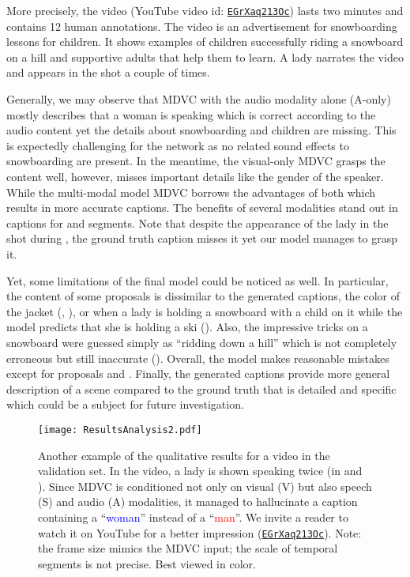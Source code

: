 \documentclass[10pt,twocolumn,letterpaper]{article}
\begin{document}
More precisely, the video (YouTube video id: \texttt{\href{https://www.youtube.com/embed/EGrXaq213Oc?rel=0}{EGrXaq213Oc}}) lasts two minutes and contains 12 human annotations. The video is an advertisement for snowboarding lessons for children. It shows examples of children successfully riding a snowboard on a hill and supportive adults that help them to learn. A lady narrates the video and appears in the shot a couple of times.

Generally, we may observe that MDVC with the audio modality alone (A-only) mostly describes that a woman is speaking which is correct according to the audio content yet the details about snowboarding and children are missing. This is expectedly challenging for the network as no related sound effects to snowboarding are present. In the meantime, the visual-only MDVC grasps the content well, however, misses important details like the gender of the speaker. While the multi-modal model MDVC borrows the advantages of both which results in more accurate captions. The benefits of several modalities stand out in captions for  and  segments. Note that despite the appearance of the lady in the shot during , the ground truth caption misses it yet our model manages to grasp it.

Yet, some limitations of the final model could be noticed as well. In particular, the content of some proposals is dissimilar to the generated captions, \eg the color of the jacket (, ), or when a lady is holding a snowboard with a child on it while the model predicts that she is holding a ski (). Also, the impressive tricks on a snowboard were guessed simply as ``ridding down a hill'' which is not completely erroneous but still inaccurate (). Overall, the model makes reasonable mistakes except for proposals  and . Finally, the generated captions provide more general description of a scene compared to the ground truth that is detailed and specific which could be a subject for future investigation.

\begin{figure*}[t]
    \begin{center}
\texttt{[image: ResultsAnalysis2.pdf]}
    \end{center}
    \vspace*{-4.5em}
    \caption{Another example of the qualitative results for a video in the validation set. In the video, a lady is shown speaking twice (in  and ). Since MDVC is conditioned not only on visual (V) but also speech (S) and audio (A) modalities, it managed to hallucinate a caption containing a ``\textcolor{blue}{woman}'' instead of a ``\textcolor{red}{man}''. We invite a reader to watch it on YouTube for a better impression  (\texttt{\href{https://www.youtube.com/embed/EGrXaq213Oc?rel=0}{EGrXaq213Oc}}). Note: the frame size mimics the MDVC input; the scale of temporal segments is not precise. Best viewed in color.}
    \label{fig:results_analysis2}
\end{figure*}
\end{document}
